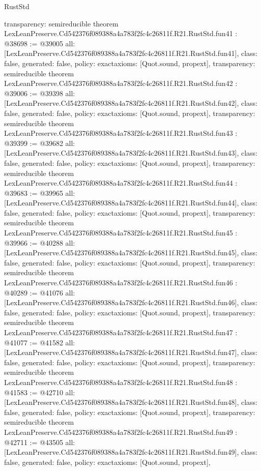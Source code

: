 \begin{lexlean}{RustStd}
\begin{coremodule}
{  transparency: semireducible
}
theorem LexLeanPreserve.Cd542376f089388a4a783f2fc4c26811f.R21.RustStd.fun41 : @38698 := @39005 {
  all: [LexLeanPreserve.Cd542376f089388a4a783f2fc4c26811f.R21.RustStd.fun41],
  class: false,
  generated: false,
  policy: exact{axioms: [Quot.sound, propext]},
  transparency: semireducible
}
theorem LexLeanPreserve.Cd542376f089388a4a783f2fc4c26811f.R21.RustStd.fun42 : @39006 := @39398 {
  all: [LexLeanPreserve.Cd542376f089388a4a783f2fc4c26811f.R21.RustStd.fun42],
  class: false,
  generated: false,
  policy: exact{axioms: [Quot.sound, propext]},
  transparency: semireducible
}
theorem LexLeanPreserve.Cd542376f089388a4a783f2fc4c26811f.R21.RustStd.fun43 : @39399 := @39682 {
  all: [LexLeanPreserve.Cd542376f089388a4a783f2fc4c26811f.R21.RustStd.fun43],
  class: false,
  generated: false,
  policy: exact{axioms: [Quot.sound, propext]},
  transparency: semireducible
}
theorem LexLeanPreserve.Cd542376f089388a4a783f2fc4c26811f.R21.RustStd.fun44 : @39683 := @39965 {
  all: [LexLeanPreserve.Cd542376f089388a4a783f2fc4c26811f.R21.RustStd.fun44],
  class: false,
  generated: false,
  policy: exact{axioms: [Quot.sound, propext]},
  transparency: semireducible
}
theorem LexLeanPreserve.Cd542376f089388a4a783f2fc4c26811f.R21.RustStd.fun45 : @39966 := @40288 {
  all: [LexLeanPreserve.Cd542376f089388a4a783f2fc4c26811f.R21.RustStd.fun45],
  class: false,
  generated: false,
  policy: exact{axioms: [Quot.sound, propext]},
  transparency: semireducible
}
theorem LexLeanPreserve.Cd542376f089388a4a783f2fc4c26811f.R21.RustStd.fun46 : @40289 := @41076 {
  all: [LexLeanPreserve.Cd542376f089388a4a783f2fc4c26811f.R21.RustStd.fun46],
  class: false,
  generated: false,
  policy: exact{axioms: [Quot.sound, propext]},
  transparency: semireducible
}
theorem LexLeanPreserve.Cd542376f089388a4a783f2fc4c26811f.R21.RustStd.fun47 : @41077 := @41582 {
  all: [LexLeanPreserve.Cd542376f089388a4a783f2fc4c26811f.R21.RustStd.fun47],
  class: false,
  generated: false,
  policy: exact{axioms: [Quot.sound, propext]},
  transparency: semireducible
}
theorem LexLeanPreserve.Cd542376f089388a4a783f2fc4c26811f.R21.RustStd.fun48 : @41583 := @42710 {
  all: [LexLeanPreserve.Cd542376f089388a4a783f2fc4c26811f.R21.RustStd.fun48],
  class: false,
  generated: false,
  policy: exact{axioms: [Quot.sound, propext]},
  transparency: semireducible
}
theorem LexLeanPreserve.Cd542376f089388a4a783f2fc4c26811f.R21.RustStd.fun49 : @42711 := @43505 {
  all: [LexLeanPreserve.Cd542376f089388a4a783f2fc4c26811f.R21.RustStd.fun49],
  class: false,
  generated: false,
  policy: exact{axioms: [Quot.sound, propext]},
}
\end{coremodule}
\end{lexlean}
